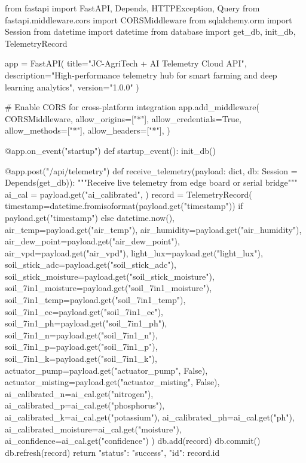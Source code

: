 \begin{pythonbox}
from fastapi import FastAPI, Depends, HTTPException, Query
from fastapi.middleware.cors import CORSMiddleware
from sqlalchemy.orm import Session
from datetime import datetime
from database import get_db, init_db, TelemetryRecord

app = FastAPI(
    title="JC-AgriTech + AI Telemetry Cloud API",
    description="High-performance telemetry hub for smart farming and deep learning analytics",
    version="1.0.0"
)

# Enable CORS for cross-platform integration
app.add_middleware(
    CORSMiddleware,
    allow_origins=["*"],
    allow_credentials=True,
    allow_methods=["*"],
    allow_headers=["*"],
)

@app.on_event("startup")
def startup_event():
    init_db()

@app.post("/api/telemetry")
def receive_telemetry(payload: dict, db: Session = Depends(get_db)):
    """Receive live telemetry from edge board or serial bridge"""
    ai_cal = payload.get("ai_calibrated", {})
    record = TelemetryRecord(
        timestamp=datetime.fromisoformat(payload.get("timestamp")) if payload.get("timestamp") else datetime.now(),
        air_temp=payload.get("air_temp"),
        air_humidity=payload.get("air_humidity"),
        air_dew_point=payload.get("air_dew_point"),
        air_vpd=payload.get("air_vpd"),
        light_lux=payload.get("light_lux"),
        soil_stick_adc=payload.get("soil_stick_adc"),
        soil_stick_moisture=payload.get("soil_stick_moisture"),
        soil_7in1_moisture=payload.get("soil_7in1_moisture"),
        soil_7in1_temp=payload.get("soil_7in1_temp"),
        soil_7in1_ec=payload.get("soil_7in1_ec"),
        soil_7in1_ph=payload.get("soil_7in1_ph"),
        soil_7in1_n=payload.get("soil_7in1_n"),
        soil_7in1_p=payload.get("soil_7in1_p"),
        soil_7in1_k=payload.get("soil_7in1_k"),
        actuator_pump=payload.get("actuator_pump", False),
        actuator_misting=payload.get("actuator_misting", False),
        ai_calibrated_n=ai_cal.get("nitrogen"),
        ai_calibrated_p=ai_cal.get("phosphorus"),
        ai_calibrated_k=ai_cal.get("potassium"),
        ai_calibrated_ph=ai_cal.get("ph"),
        ai_calibrated_moisture=ai_cal.get("moisture"),
        ai_confidence=ai_cal.get("confidence")
    )
    db.add(record)
    db.commit()
    db.refresh(record)
    return {"status": "success", "id": record.id}


\end{pythonbox}
